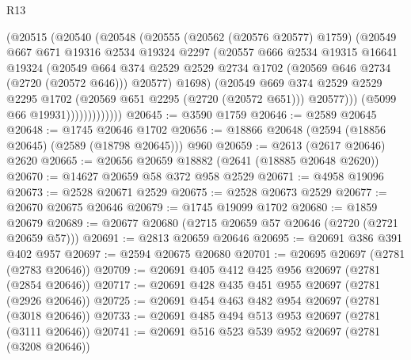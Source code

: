 \begin{lexlean}{R13}
\begin{coremodule}
                      (@20515
                        (@20540
                          (@20548
                            (@20555
                              (@20562 (@20576 @20577) @1759)
                              (@20549
                                @667
                                @671
                                @19316
                                @2534
                                @19324
                                @2297
                                (@20557
                                  @666
                                  @2534
                                  @19315
                                  @16641
                                  @19324
                                  (@20549
                                    @664
                                    @374
                                    @2529
                                    @2529
                                    @2734
                                    @1702
                                    (@20569 @646 @2734 (@2720 (@20572 @646)))
                                    @20577)
                                  @1698)
                                (@20549
                                  @669
                                  @374
                                  @2529
                                  @2529
                                  @2295
                                  @1702
                                  (@20569 @651 @2295 (@2720 (@20572 @651)))
                                  @20577)))
                            (@5099 @66 @19931)))))))))))))
@20645 := @3590 @1759
@20646 := @2589 @20645
@20648 := @1745 @20646 @1702
@20656 := @18866 @20648 (@2594 (@18856 @20645) (@2589 (@18798 @20645))) @960
@20659 := @2613 (@2617 @20646) @2620
@20665 := @20656 @20659 @18882 (@2641 (@18885 @20648 @2620))
@20670 := @14627 @20659 @58 @372 @958 @2529
@20671 := @4958 @19096
@20673 := @2528 @20671 @2529
@20675 := @2528 @20673 @2529
@20677 := @20670 @20675 @20646
@20679 := @1745 @19099 @1702
@20680 := @1859 @20679
@20689 := @20677 @20680 (@2715 @20659 @57 @20646 (@2720 (@2721 @20659 @57)))
@20691 := @2813 @20659 @20646
@20695 := @20691 @386 @391 @402 @957
@20697 := @2594 @20675 @20680
@20701 := @20695 @20697 (@2781 (@2783 @20646))
@20709 := @20691 @405 @412 @425 @956 @20697 (@2781 (@2854 @20646))
@20717 := @20691 @428 @435 @451 @955 @20697 (@2781 (@2926 @20646))
@20725 := @20691 @454 @463 @482 @954 @20697 (@2781 (@3018 @20646))
@20733 := @20691 @485 @494 @513 @953 @20697 (@2781 (@3111 @20646))
@20741 := @20691 @516 @523 @539 @952 @20697 (@2781 (@3208 @20646))

\end{coremodule}
\end{lexlean}
